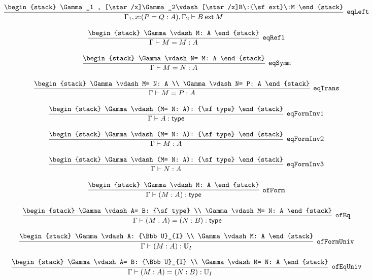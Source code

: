 \[
\infer[{\tt eqLeft}]{\Gamma_1 ,x\mathord{:}(P= Q: A), \Gamma_2 \vdash B\:{\sf ext}\:M}{
\begin{stack}
\Gamma_1 , [\star /x]\Gamma_2\vdash [\star /x]B\:{\sf ext}\:M
\end{stack}}
\]

\[
\infer[{\tt eqRefl}]{\Gamma \vdash M= M: A}{
\begin{stack}
\Gamma \vdash M: A
\end{stack}}
\]

\[
\infer[{\tt eqSymm}]{\Gamma \vdash M= N: A}{
\begin{stack}
\Gamma \vdash N= M: A
\end{stack}}
\]

\[
\infer[{\tt eqTrans}]{\Gamma \vdash M= P: A}{
\begin{stack}
\Gamma \vdash M= N: A
\\
\Gamma \vdash N= P: A
\end{stack}}
\]

\[
\infer[{\tt eqFormInv1}]{\Gamma \vdash A: {\sf type}}{
\begin{stack}
\Gamma \vdash (M= N: A): {\sf type}
\end{stack}}
\]

\[
\infer[{\tt eqFormInv2}]{\Gamma \vdash M: A}{
\begin{stack}
\Gamma \vdash (M= N: A): {\sf type}
\end{stack}}
\]

\[
\infer[{\tt eqFormInv3}]{\Gamma \vdash N: A}{
\begin{stack}
\Gamma \vdash (M= N: A): {\sf type}
\end{stack}}
\]

\[
\infer[{\tt ofForm}]{\Gamma \vdash (M: A): {\sf type}}{
\begin{stack}
\Gamma \vdash M: A
\end{stack}}
\]

\[
\infer[{\tt ofEq}]{\Gamma \vdash (M: A)= (N: B): {\sf type}}{
\begin{stack}
\Gamma \vdash A= B: {\sf type}
\\
\Gamma \vdash M= N: A
\end{stack}}
\]

\[
\infer[{\tt ofFormUniv}]{\Gamma \vdash (M: A): {\Bbb U}_{I}}{
\begin{stack}
\Gamma \vdash A: {\Bbb U}_{I}
\\
\Gamma \vdash M: A
\end{stack}}
\]

\[
\infer[{\tt ofEqUniv}]{\Gamma \vdash (M: A)= (N: B): {\Bbb U}_{I}}{
\begin{stack}
\Gamma \vdash A= B: {\Bbb U}_{I}
\\
\Gamma \vdash M= N: A
\end{stack}}
\]


